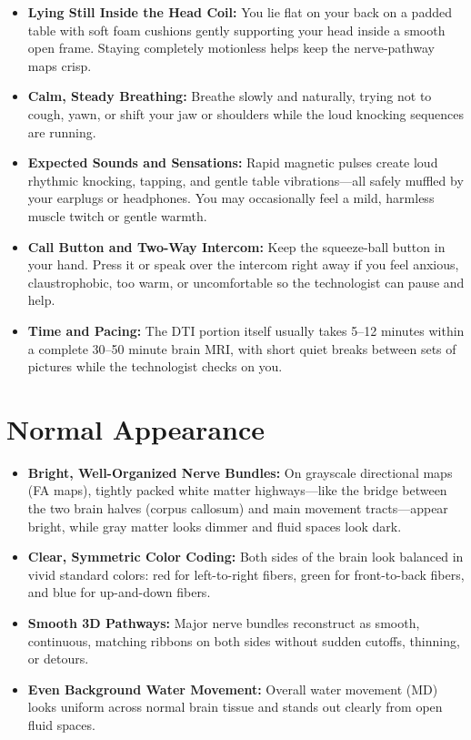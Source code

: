 \begin{itemize}
    \item \textbf{Lying Still Inside the Head Coil:} You lie flat on your back on a padded table with soft foam cushions gently supporting your head inside a smooth open frame. Staying completely motionless helps keep the nerve-pathway maps crisp.
    \item \textbf{Calm, Steady Breathing:} Breathe slowly and naturally, trying not to cough, yawn, or shift your jaw or shoulders while the loud knocking sequences are running.
    \item \textbf{Expected Sounds and Sensations:} Rapid magnetic pulses create loud rhythmic knocking, tapping, and gentle table vibrations---all safely muffled by your earplugs or headphones. You may occasionally feel a mild, harmless muscle twitch or gentle warmth.
    \item \textbf{Call Button and Two-Way Intercom:} Keep the squeeze-ball button in your hand. Press it or speak over the intercom right away if you feel anxious, claustrophobic, too warm, or uncomfortable so the technologist can pause and help.
    \item \textbf{Time and Pacing:} The DTI portion itself usually takes 5--12 minutes within a complete 30--50 minute brain MRI, with short quiet breaks between sets of pictures while the technologist checks on you.
\end{itemize}

\section{Normal Appearance}

\begin{itemize}
    \item \textbf{Bright, Well-Organized Nerve Bundles:} On grayscale directional maps (FA maps), tightly packed white matter highways---like the bridge between the two brain halves (corpus callosum) and main movement tracts---appear bright, while gray matter looks dimmer and fluid spaces look dark.
    \item \textbf{Clear, Symmetric Color Coding:} Both sides of the brain look balanced in vivid standard colors: red for left-to-right fibers, green for front-to-back fibers, and blue for up-and-down fibers.
    \item \textbf{Smooth 3D Pathways:} Major nerve bundles reconstruct as smooth, continuous, matching ribbons on both sides without sudden cutoffs, thinning, or detours.
    \item \textbf{Even Background Water Movement:} Overall water movement (MD) looks uniform across normal brain tissue and stands out clearly from open fluid spaces.
\end{itemize}


